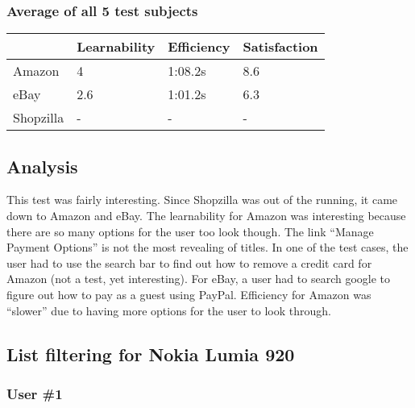 \documentclass[11pt, oneside]{article}   	%
\begin{document}
\subsubsection{Average of all 5 test subjects}

\begin{tabular}{| l | l | l | l |}
    \hline
     & Learnability & Efficiency & Satisfaction \\ \hline
    Amazon & 4 & 1:08.2s & 8.6 \\ \hline
    eBay & 2.6 & 1:01.2s & 6.3 \\ \hline
    Shopzilla & - & - & - \\\hline
\end{tabular}

\subsection{Analysis}

This test was fairly interesting. Since Shopzilla was out of the running, it came down to Amazon and eBay. The learnability for Amazon was interesting because there are so many options for the user too look though. The link ``Manage Payment Options'' is not the most revealing of titles. In one of the test cases, the user had to use the search bar to find out how to remove a credit card for Amazon (not a test, yet interesting). For eBay, a user had to search google to figure out how to pay as a guest using PayPal.  Efficiency for Amazon was ``slower'' due to having more options for the user to look through.

\subsection{List filtering for Nokia Lumia 920}

\subsubsection{User \#1}
\end{document}
